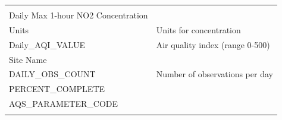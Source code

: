 \documentclass[12pt,]{article}
\begin{document}
\begin{longtable}[]{@{}ll@{}}
\begin{minipage}[t]{0.29\columnwidth}
\end{minipage}\tabularnewline
\begin{minipage}[t]{0.65\columnwidth}\raggedright
Daily Max 1-hour NO2 Concentration\strut
\end{minipage} & \begin{minipage}[t]{0.29\columnwidth}\raggedright
\strut
\end{minipage}\tabularnewline
\begin{minipage}[t]{0.65\columnwidth}\raggedright
Units\strut
\end{minipage} & \begin{minipage}[t]{0.29\columnwidth}\raggedright
Units for concentration\strut
\end{minipage}\tabularnewline
\begin{minipage}[t]{0.65\columnwidth}\raggedright
Daily\_AQI\_VALUE\strut
\end{minipage} & \begin{minipage}[t]{0.29\columnwidth}\raggedright
Air quality index (range 0-500)\strut
\end{minipage}\tabularnewline
\begin{minipage}[t]{0.65\columnwidth}\raggedright
Site Name\strut
\end{minipage} & \begin{minipage}[t]{0.29\columnwidth}\raggedright
\strut
\end{minipage}\tabularnewline
\begin{minipage}[t]{0.65\columnwidth}\raggedright
DAILY\_OBS\_COUNT\strut
\end{minipage} & \begin{minipage}[t]{0.29\columnwidth}\raggedright
Number of observations per day\strut
\end{minipage}\tabularnewline
\begin{minipage}[t]{0.65\columnwidth}\raggedright
PERCENT\_COMPLETE\strut
\end{minipage} & \begin{minipage}[t]{0.29\columnwidth}\raggedright
\strut
\end{minipage}\tabularnewline
\begin{minipage}[t]{0.65\columnwidth}\raggedright
AQS\_PARAMETER\_CODE\strut
\end{minipage} & \begin{minipage}[t]{0.29\columnwidth}\raggedright
\strut
\end{minipage}\tabularnewline
\begin{minipage}[t]{0.65\columnwidth}\raggedright

\end{minipage}
\end{longtable}
\end{document}
